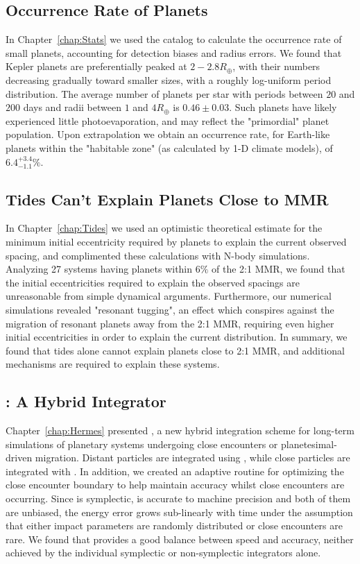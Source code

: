 \subsection{Occurrence Rate of \kep Planets}
In Chapter~\ref{chap:Stats} we used the \citet{Ramirez2014} \kep catalog to calculate the occurrence rate of small planets, accounting for detection biases and radius errors. 
We found that Kepler planets are preferentially peaked at $2-2.8R_\oplus$, with their numbers decreasing gradually toward smaller sizes, with a roughly log-uniform period distribution.
The average number of planets per star with periods between $20$ and $200$ days and radii between $1$ and $4R_\oplus$ is $0.46 \pm 0.03$. 
Such planets have likely experienced little photoevaporation, and may reflect the "primordial" planet population. 
Upon extrapolation we obtain an occurrence rate, for Earth-like planets within the "habitable zone" (as calculated by 1-D climate models), of $6.4^{+3.4}_{-1.1}\%$. 

\subsection{Tides Can't Explain Planets Close to MMR}
In Chapter~\ref{chap:Tides} we used an optimistic theoretical estimate for the minimum initial eccentricity required by \kep planets to explain the current observed spacing, and complimented these calculations with N-body simulations.
Analyzing 27 \kep systems having planets within $6\%$ of the 2:1 MMR, we found that the initial eccentricities required to explain the observed spacings are unreasonable from simple dynamical arguments.
Furthermore, our numerical simulations revealed "resonant tugging", an effect which conspires against the migration of resonant planets away from the 2:1 MMR, requiring even higher initial eccentricities in order to explain the current \kep distribution. 
In summary, we found that tides alone cannot explain planets close to 2:1 MMR, and additional mechanisms are required to explain these systems. 

\subsection{\hermes: A Hybrid Integrator}
Chapter~\ref{chap:Hermes} presented \hermes, a new hybrid integration scheme for long-term simulations of planetary systems undergoing close encounters or planetesimal-driven migration. 
Distant particles are integrated using \whfast, while close particles are integrated with \ias.
In addition, we created an adaptive routine for optimizing the close encounter boundary to help maintain accuracy whilst close encounters are occurring.
Since \whfast is symplectic, \ias is accurate to machine precision and both of them are unbiased, the energy error grows sub-linearly with time under the assumption that either impact parameters are randomly distributed or close encounters are rare.
We found that \hermes provides a good balance between speed and accuracy, neither achieved by the individual symplectic or non-symplectic integrators alone.

